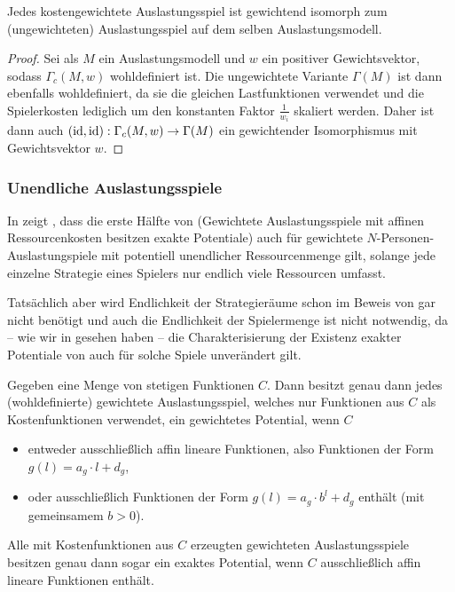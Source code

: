 \begin{lemma}\label{lemma:KostengewAuslIsomZuAusl}
	Jedes kostengewichtete Auslastungsspiel ist gewichtend isomorph zum (ungewichteten) Auslastungsspiel auf dem selben Auslastungsmodell.
\end{lemma}

\begin{proof}
	Sei als $M$ ein Auslastungsmodell und $w$ ein positiver Gewichtsvektor, sodass $\Gamma_c(M, w)$ wohldefiniert ist. Die ungewichtete Variante $\Gamma(M)$ ist dann ebenfalls wohldefiniert, da sie die gleichen Lastfunktionen verwendet und die Spielerkosten lediglich um den konstanten Faktor $\frac{1}{w_i}$ skaliert werden. Daher ist dann auch $(\mathrm{id}, \mathrm{id}): \Gamma_c(M,w) \to \Gamma(M)$ ein gewichtender Isomorphismus mit Gewichtsvektor $w$.
\end{proof}


\subsubsection{Unendliche Auslastungsspiele}\label{sec:Auslastungsspiele:unendliche}

In \cite[Abschnitt 8]{AUniversalCostrGenPotGames} zeigt \citeauthor{AUniversalCostrGenPotGames}, dass die erste Hälfte von  (\glqq Gewichtete Auslastungsspiele mit affinen Ressourcenkosten besitzen exakte Potentiale\grqq) auch für gewichtete $N$-Personen-Auslastungspiele mit potentiell unendlicher Ressourcenmenge gilt, solange jede einzelne Strategie eines Spielers nur endlich viele Ressourcen umfasst. 

Tatsächlich aber wird Endlichkeit der Strategieräume schon im Beweis von \citeauthor{CharExGewPotinWCG} gar nicht benötigt und auch die Endlichkeit der Spielermenge ist nicht notwendig, da -- wie wir in  gesehen haben -- die Charakterisierung der Existenz exakter Potentiale von \citeauthor{MonShap} auch für solche Spiele unverändert gilt.

\begin{satz}\label{satz:CharExGewPotinWCG2}
	Gegeben eine Menge von stetigen Funktionen $C$. Dann besitzt genau dann jedes (wohldefinierte) gewichtete Auslastungsspiel, welches nur Funktionen aus $C$ als Kostenfunktionen verwendet, ein gewichtetes Potential, wenn $C$
	\begin{itemize}
		\item entweder ausschließlich affin lineare Funktionen, also Funktionen der Form $g(l) = a_g \cdot l + d_g$,
		\item oder ausschließlich Funktionen der Form $g(l) = a_g\cdot b^l + d_g$ enthält (mit gemeinsamem $b > 0$).
	\end{itemize}
	Alle mit Kostenfunktionen aus $C$ erzeugten gewichteten Auslastungsspiele besitzen genau dann sogar ein exaktes Potential, wenn $C$ ausschließlich affin lineare Funktionen enthält.
\end{satz}

